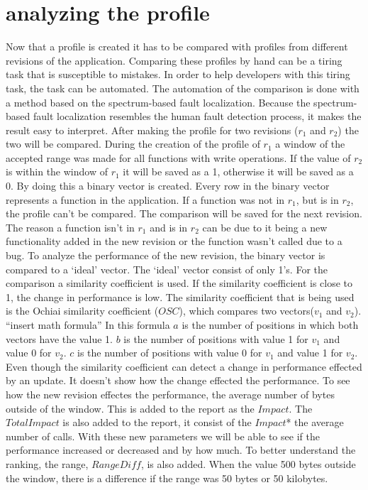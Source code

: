 \documentclass[oneside]{book}
\begin{document}
\section*{analyzing the profile}
Now that a profile is created it has to be compared with profiles from different revisions of the application. Comparing these profiles by hand can be a tiring task that is susceptible to mistakes. In order to help developers with this tiring task, the task can be automated. The automation of the comparison is done with a method based on the spectrum-based fault localization. Because the spectrum-based fault localization resembles the human fault detection process, it makes the result easy to interpret. \newline
After making the profile for two revisions ($r_1$ and $r_2$) the two will be compared. During the creation of the profile of $r_1$ a window of the accepted range was made for all functions with write operations. If the value of $r_2$  is within the window of $r_1$ it will be saved as a 1, otherwise it will be saved as a 0. By doing this a binary vector is created. Every row in the binary vector represents a function in the application. If a function was not in $r_1$, but is in $r_2$, the profile can't be compared. The comparison will be saved for the next revision. The reason a function isn't in $r_1$ and is in $r_2$ can be due to it being a new functionality added in the new revision or the function wasn't called due to a bug. \newline
To analyze the performance of the new revision, the binary vector is compared to a `ideal' vector. The `ideal' vector consist of only 1's. For the comparison a similarity coefficient is used. If the similarity coefficient is close to 1, the change in performance is low. The similarity coefficient that is being used is the Ochiai similarity coefficient ($OSC$), which compares two vectors($v_1$ and $v_2$).\newline
\newline
``insert math formula'' \newline
\newline
In this formula $a$ is the number of positions in which both vectors have the value 1. $b$ is the number of positions with value 1 for $v_1$ and value 0 for $v_2$. $c$ is the number of positions with value 0 for $v_1$ and value 1 for $v_2$.\newline
Even though the similarity coefficient can detect a change in performance effected by an update. It doesn't show how the change effected the performance. To see how the new revision effectes the performance, the average number of bytes outside of the window. This is added to the report as the $Impact$. The $TotalImpact$ is also added to the report, it consist of the $Impact$* the average number of calls. With these new parameters we will be able to see if the performance increased or decreased and by how much. To better understand the ranking, the range, $RangeDiff$, is also added. When the value 500 bytes outside the window, there is a difference if the range was 50 bytes or 50 kilobytes. \newline
\end{document}
